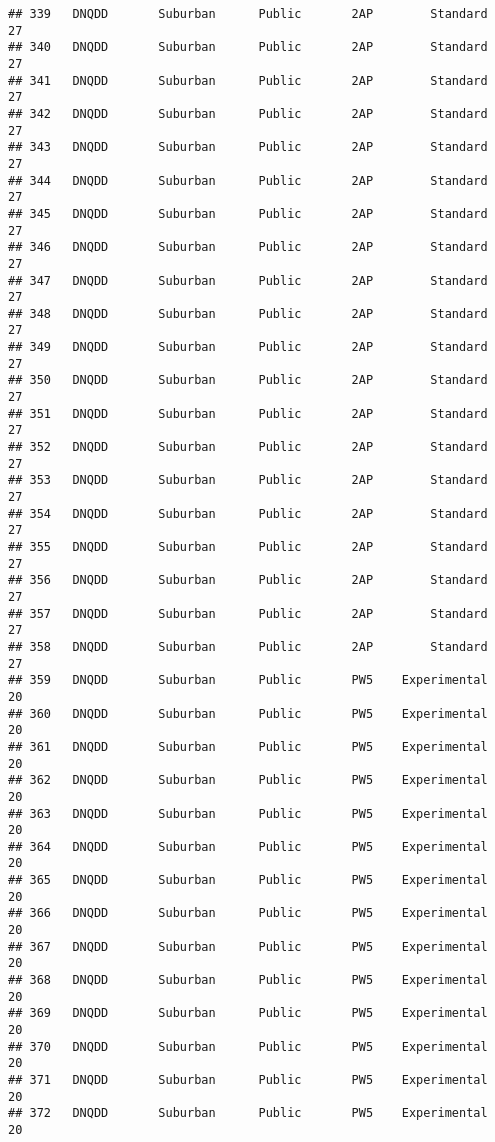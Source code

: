 \documentclass[
]{article}
\begin{document}
\begin{verbatim}
## 339   DNQDD       Suburban      Public       2AP        Standard        27
## 340   DNQDD       Suburban      Public       2AP        Standard        27
## 341   DNQDD       Suburban      Public       2AP        Standard        27
## 342   DNQDD       Suburban      Public       2AP        Standard        27
## 343   DNQDD       Suburban      Public       2AP        Standard        27
## 344   DNQDD       Suburban      Public       2AP        Standard        27
## 345   DNQDD       Suburban      Public       2AP        Standard        27
## 346   DNQDD       Suburban      Public       2AP        Standard        27
## 347   DNQDD       Suburban      Public       2AP        Standard        27
## 348   DNQDD       Suburban      Public       2AP        Standard        27
## 349   DNQDD       Suburban      Public       2AP        Standard        27
## 350   DNQDD       Suburban      Public       2AP        Standard        27
## 351   DNQDD       Suburban      Public       2AP        Standard        27
## 352   DNQDD       Suburban      Public       2AP        Standard        27
## 353   DNQDD       Suburban      Public       2AP        Standard        27
## 354   DNQDD       Suburban      Public       2AP        Standard        27
## 355   DNQDD       Suburban      Public       2AP        Standard        27
## 356   DNQDD       Suburban      Public       2AP        Standard        27
## 357   DNQDD       Suburban      Public       2AP        Standard        27
## 358   DNQDD       Suburban      Public       2AP        Standard        27
## 359   DNQDD       Suburban      Public       PW5    Experimental        20
## 360   DNQDD       Suburban      Public       PW5    Experimental        20
## 361   DNQDD       Suburban      Public       PW5    Experimental        20
## 362   DNQDD       Suburban      Public       PW5    Experimental        20
## 363   DNQDD       Suburban      Public       PW5    Experimental        20
## 364   DNQDD       Suburban      Public       PW5    Experimental        20
## 365   DNQDD       Suburban      Public       PW5    Experimental        20
## 366   DNQDD       Suburban      Public       PW5    Experimental        20
## 367   DNQDD       Suburban      Public       PW5    Experimental        20
## 368   DNQDD       Suburban      Public       PW5    Experimental        20
## 369   DNQDD       Suburban      Public       PW5    Experimental        20
## 370   DNQDD       Suburban      Public       PW5    Experimental        20
## 371   DNQDD       Suburban      Public       PW5    Experimental        20
## 372   DNQDD       Suburban      Public       PW5    Experimental        20

\end{verbatim}
\end{document}
